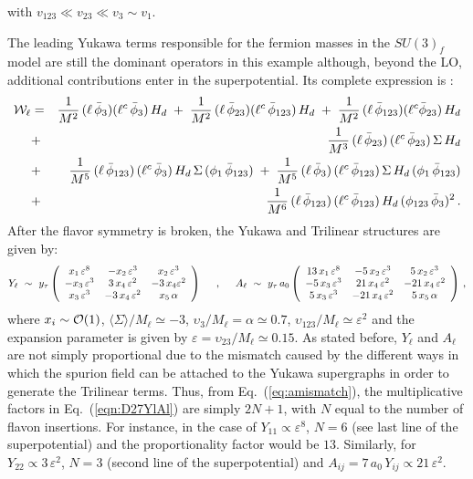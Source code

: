 \documentclass[a4paper,11pt]{article}
\newcommand{\bea}{\begin{eqnarray}}
\newcommand{\beq}{\begin{equation}}
\newcommand{\eea}{\end{eqnarray}}
\newcommand{\eeq}{\end{equation}}
\newcommand{\vep}{\varepsilon}
\newcommand{\nn}{\nonumber}
\newcommand{\eq}[1]{Eq.~(\ref{#1})}
\begin{document}
with $v_{123} \ll v_{23} \ll v_{3} \sim v_1$. 

The leading Yukawa terms responsible for the fermion masses in the $SU(3)_f$ model are still the dominant operators in this example although, beyond the LO, additional contributions enter in the superpotential. Its complete expression is \cite{deMedeirosVarzielas:2006fc}:
\bea
  {\cal W_\ell} & = & \frac{1}{M^2}\, (\ell\,\bar\phi_3)(\ell^c\,\bar\phi_3)\, H_d \;+\;  
  \frac{1}{M^2}\, (\ell\,\bar\phi_{23})(\ell^c\,\bar\phi_{123})\, H_d \;+\; \frac{1}
  {M^2}\,(\ell\,\bar\phi_{123})(\ell^c\bar\phi_{23})\, H_d \label{eqn:D27sp} \\
  & + & \frac{1}{M^3}\,(\ell\,\bar\phi_{23})\,(\ell^c\,\bar\phi_{23})\,\Sigma\,H_d \nn \\
  & + & \frac{1}{M^5}\, (\ell\,\bar\phi_{123})\,(\ell^c\,\bar\phi_{3})\,H_d\,\Sigma\,
  (\phi_{1}\,\bar\phi_{123})
    \;+\; \frac{1}{M^5}\, (\ell\,\bar\phi_{3})\,(\ell^c\,\bar\phi_{123})\,\Sigma\,H_d\,
    (\phi_{1}\,\bar\phi_{123}) \nn \\ 
  & + &\; \frac{1}{M^6}\,(\ell\,\bar\phi_{123})\,(\ell^c\,\bar\phi_{123})\,H_d\,
  (\phi_{123}\,\bar\phi_3)^2 \,.
  \nn \eea
After the flavor symmetry is broken, the Yukawa and Trilinear structures are given by:
\beq \label{eqn:D27YlAl}
 Y_\ell ~ \sim ~ y_\tau\left(\begin{array}{ccc}
             x_1\,\vep^8 &    -x_2\,\vep^3 & x_2\,\vep^3 \\
            -x_3\,\vep^3 &  3\,x_4\,\vep^2 & -3\,x_4\vep^2 \\
             x_3\,\vep^3 & -3\,x_4\,\vep^2 & x_5\,\alpha   
             \end{array} \right)
 \hspace{.5cm}, \hspace{.5cm}
 A_\ell ~ \sim ~ y_\tau\,a_{0} \left(\begin{array}{ccc}
                    13\,x_1\,\vep^8 &  -5\,x_2\,\vep^3 &   5\,x_2\,\vep^3 \\
                    -5\,x_3\,\vep^3 &  21\,x_4\,\vep^2 & -21\,x_4\,\vep^2 \\
                    5\,x_3\,\vep^3  & -21\,x_4\,\vep^2 &   5\,x_5\,\alpha   
                    \end{array} \right)  \, ,            
\eeq
where $x_i\sim {\cal O}(1)$, $\langle\Sigma\rangle/M_\ell\simeq-3$, $\upsilon_3/M_\ell=\alpha\simeq0.7$, $\upsilon_{123}/M_\ell\simeq \vep^2$ and the expansion parameter is given by $\vep=\upsilon_{23}/M_\ell\simeq0.15$. As stated before, $Y_\ell$ and $A_\ell$ are not simply proportional due to the mismatch caused by the different ways in which the spurion field can be attached to the Yukawa supergraphs in order to generate the Trilinear terms. Thus, from \eq{eq:amismatch}, the multiplicative factors in \eq{eqn:D27YlAl} are simply $2N +1$, with $N$ equal to the number of flavon insertions. For instance, in the case of $Y_{11} \propto \vep^8$, $N=6$ (see last line of the superpotential) and the proportionality factor would be $13$. Similarly, for $Y_{22} \propto 3\,\vep^2$, $N=3$ (second line of the superpotential) and $A_{ij}=7\,a_0\,Y_{ij}\propto 21\,\vep^2$.
\end{document}
